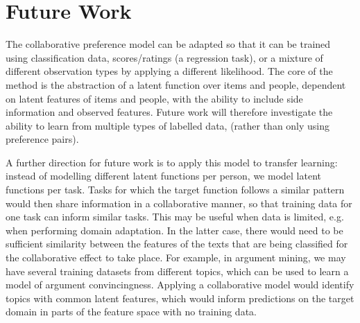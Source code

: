 \section{Future Work}

The collaborative preference model can be adapted so that it can be trained using 
classification data, scores/ratings (a regression task), or a mixture of different 
observation types by applying a different likelihood. 
The core of the method is the abstraction of a latent function over items and people, 
dependent on latent features of items and people, with the ability to include side information 
and observed features.
Future work will therefore investigate the ability to learn from multiple types of labelled data, 
(rather than only using preference pairs).

A further direction for future work is to apply this model to transfer learning: 
instead of modelling different latent functions per person, we model latent functions per task. 
Tasks for which the target function follows a similar pattern would then share information in 
a collaborative manner, so that training data for one task can inform similar tasks. This may be 
useful when data is limited, e.g. when performing domain adaptation. In the latter case, there would
need to be sufficient similarity between the features of the texts that are being classified for 
the collaborative effect to take place. 
For example, in argument mining, we may have several training datasets from different topics,
which can be used to learn a model of argument convincingness. Applying a collaborative model would
identify topics with common latent features, which would inform predictions on the target domain 
in parts of the feature space with no training data.
